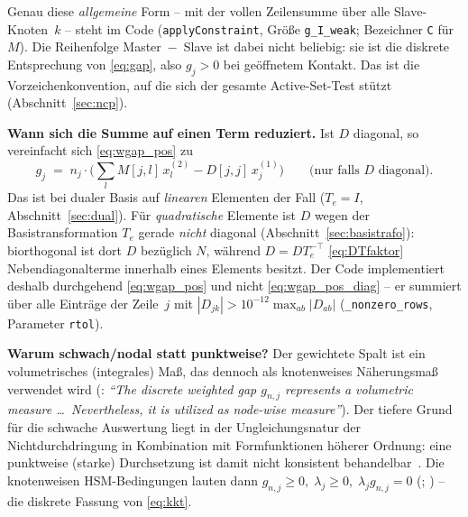 \documentclass[a4paper,11pt]{article}
\def\bm#1{#1}%
\def\tilde#1{#1}%
\newcommand{\code}[1]{\texttt{\small #1}}
\begin{document}
\medskip
\noindent Genau diese \emph{allgemeine} Form -- mit der vollen Zeilensumme über alle
Slave-Knoten~$k$ -- steht im Code (\code{applyConstraint}, Größe \code{g\_I\_weak}; Bezeichner
\code{C} für $\bm M$).
Die Reihenfolge Master~$-$~Slave ist dabei nicht beliebig: sie ist die diskrete Entsprechung
von \eqref{eq:gap}, also $\tilde g_j>0$ bei geöffnetem Kontakt. Das ist die Vorzeichen\-konvention,
auf die sich der gesamte Active-Set-Test stützt (Abschnitt~\ref{sec:ncp}).

\medskip
\noindent\textbf{Wann sich die Summe auf einen Term reduziert.} Ist $\bm D$ diagonal, so
vereinfacht sich \eqref{eq:wgap_pos} zu
\begin{equation}
\tilde g_{j} \;=\; \bm n_j\!\cdot\!\Big(\sum_l \bm M[j,l]\,\bm x_l^{(2)}
- \bm D[j,j]\,\bm x_j^{(1)}\Big)
\qquad\text{(nur falls } \bm D \text{ diagonal)} .
\label{eq:wgap_pos_diag}
\end{equation}
Das ist bei dualer Basis auf \emph{linearen} Elementen der Fall ($\bm T_e=\bm I$,
Abschnitt~\ref{sec:dual}). Für \emph{quadratische} Elemente ist $\bm D$ wegen der
Basistransformation $\bm T_e$ gerade \emph{nicht} diagonal (Abschnitt~\ref{sec:basistrafo}):
biorthogonal ist dort $\tilde{\bm D}$ bezüglich $\tilde{\bm N}$, während
$\bm D=\tilde{\bm D}\bm T_e^{-\top}$ \eqref{eq:DTfaktor} Nebendiagonalterme innerhalb eines
Elements besitzt. Der Code
implementiert deshalb durchgehend \eqref{eq:wgap_pos} und nicht \eqref{eq:wgap_pos_diag} --
er summiert über alle Einträge der Zeile~$j$ mit $|D_{jk}|>10^{-12}\max_{ab}|D_{ab}|$
(\code{\_nonzero\_rows}, Parameter \code{rtol}).

\medskip
\noindent\textbf{Warum schwach/nodal statt punktweise?} Der gewichtete Spalt ist ein volumetrisches
(integrales) Maß, das dennoch als knotenweises Näherungsmaß verwendet wird
(\citealp{farah}: \emph{``The discrete weighted gap $\tilde g_{n,j}$ represents a volumetric measure
\ldots\ Nevertheless, it is utilized as node-wise measure''}). Der tiefere Grund für die schwache
Auswertung liegt in der Ungleichungsnatur der Nichtdurchdringung in Kombination mit
Formfunktionen höherer Ordnung: eine punktweise (starke) Durchsetzung ist damit nicht konsistent
behandelbar~\citep[S.~B429]{popp2012}. Die knotenweisen HSM-Bedingungen lauten dann
$\tilde g_{n,j}\ge0,\; \lambda_j\ge0,\; \lambda_j\tilde g_{n,j}=0$
(\citealp[Gl.~(3.7)]{popp2012}; \citealp[Gl.~(3.41)]{farah}) -- die diskrete Fassung von \eqref{eq:kkt}.
\end{document}
